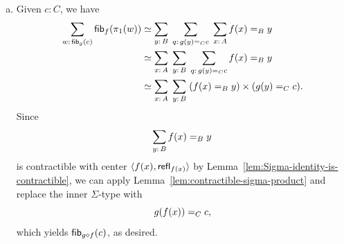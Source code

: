 \begin{solution}
\begin{enumerate}[a),font=\upshape]
\begin{align*}
                    p
                    \eq{g(f(x))\eq{C}g(b)}
                    \fun{ap}_g(q)\\
            &\simeq
                \sum_{x\colon A}\;
                \sum_{p\colon g(f(x))\eq{C}g(b)}\;
                \sum_{q\colon f(x)\eq{B}b}
                    \fun{ap}_g(q)
                    \eq{g(f(x))\eq{C}g(b)}
                    p\\
            &\simeq
                \sum_{x\colon A}\;
                \sum_{q\colon f(x)\eq{B}b}\;
                \explain[\text{Contractible by Lem.~\ref{lem:Sigma-identity-is-contractible}}]{
                \sum_{p\colon g(f(x))\eq{C}g(b)}
                    \fun{ap}_g(q)
                    \eq{g(f(x))\eq{C}g(b)}
                    p}\\
            &\simeq
                \sum_{x\colon A}\;
                \sum_{q\colon f(x)\eq{B}b}
                    \fun1\\
            &\simeq\sum_{x\colon A}f(x)\eq{B}b\\
            &\equiv\fun{fib}_f(b).
        \end{align*}

        \textbf{Note.} The sequence
        \[
            \fun{fib}_f(b)\to\fun{fib}_{g\circ f}(g(b))\xrightarrow{\phi}\fun{fib}_g(g(b))
        \]
        shows that $\fun{fib}_f(b)$ behaves as the ``kernel'' of $\phi$. It is what in algebraic topology is called a \textsl{fiber sequence}, the geometric analogue of an algebraic exact sequence.


        \item Given $c\colon C$, we have
        \begin{align*}
            \sum_{w\colon\fun{fib}_g(c)}
                \fun{fib}_f(\pi_1(w))
                &\simeq
                    \sum_{y\colon B}\;
                    \sum_{q\colon g(y)\eq{C}c}\;
                    \sum_{x\colon A}f(x)\eq{B}y\\
                &\simeq
                    \sum_{x\colon A}\;
                    \sum_{y\colon B}\;
                    \sum_{q\colon g(y)\eq{C}c}
                    f(x)\eq{B}y\\
                &\simeq
                    \sum_{x\colon A}\;
                    \sum_{y\colon B}\;
                    (f(x)\eq{B}y)\times(g(y)\eq{C}c).
        \end{align*}
        Since
        \[
            \sum_{y\colon B}f(x)\eq{B}y
        \]
        is contractible with center $\langle f(x),\mathsf{refl}_{f(x)}\rangle$ by Lemma~\ref{lem:Sigma-identity-is-contractible}, we can apply Lemma~\ref{lem:contractible-sigma-product} and replace the inner $\Sigma$-type with
        \[
            g(f(x))\mathrel{=_{C}}c,
        \]
        which yields $\mathsf{fib}_{g\circ f}(c)$, as desired.


\end{enumerate}
\end{solution}
